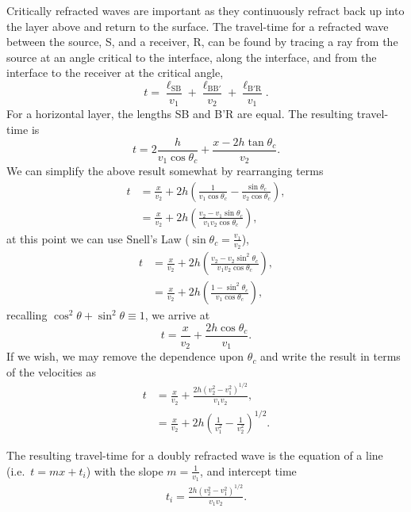 Critically refracted waves are important as they continuously refract back up into the layer above and return to the surface.  The travel-time for a refracted wave between the source, S, and a receiver, R, can be found by tracing a ray from the source at an angle critical to the interface, along the interface, and from the interface to the receiver at the critical angle,
\begin{equation}
    t = \frac{\ell_\mathrm{SB}}{v_1} + \frac{\ell_\mathrm{BB'}}{v_2} +
    \frac{\ell_\mathrm{B'R}}{v_1}.
\end{equation}
For a horizontal layer, the lengths SB and B'R are equal.  The resulting
travel-time is
\begin{equation}
    t = 2 \frac{h}{v_1 \cos \theta_c} + \frac{x - 2 h \tan \theta_c}{v_2}.
\end{equation}
We can simplify the above result somewhat by rearranging terms
\begin{align*}
    t & = \frac{x}{v_2} + 2 h
        \left( \frac{1}{v_1 \cos \theta_c}
        - \frac{\sin \theta_c}{v_2 \cos \theta_c} \right), \\
    & = \frac{x}{v_2} + 2 h
        \left( \frac{v_2 - v_1 \sin \theta_c}{v_1 v_2 \cos \theta_c} 
         \right),
\end{align*}
at this point we can use Snell's Law ($\sin \theta_c = \frac{v_1}{v_2}$),
\begin{align*}
    t & = \frac{x}{v_2} + 2 h
        \left( \frac{v_2 - v_2 \sin^2 \theta_c}{v_1 v_2 \cos \theta_c} \right), \\
    & = \frac{x}{v_2} + 2 h
        \left( \frac{1 - \sin^2 \theta_c}{v_1 \cos \theta_c} \right),
\end{align*}
recalling $\cos^2 \theta + \sin^2 \theta \equiv 1$, we arrive at
\begin{equation}
    t = \frac{x}{v_2} +
        \frac{2 h \cos \theta_c}{v_1} .
\end{equation}
If we wish, we may remove the dependence upon $\theta_c$ and write the result in terms of the velocities as
\begin{align}
    t & = \frac{x}{v_2} +
        \frac{2 h (v_2^2 - v_1^2)^{1/2}}{v_1 v_2} , \\
      & = \frac{x}{v_2} +
      2 h \left( \frac{1}{v_1^2} - \frac{1}{v_2^2} \right)^{1/2}.
\end{align}

The resulting travel-time for a doubly refracted wave is the equation of a line (i.e.\ $t = m x + t_i$) with the slope $m = \frac{1}{v_1}$, and intercept time
\begin{align}
    t_i = \frac{2 h (v_2^2 - v_1^2)^{1/2}}{v_1 v_2} .
\end{align}

